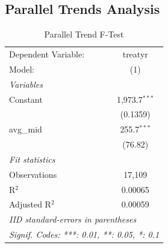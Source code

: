 \documentclass[12pt,a4paper]{article}
\begin{document}
\begin{appendices}
\subsection{Parallel Trends Analysis}\label{app4}
\begin{table}[!hptb]
\centering
\caption{Parallel Trend F-Test\label{paratrend}}
\begin{tabular}{lc}
   \tabularnewline \midrule \midrule
   Dependent Variable: & treatyr\\  
   Model:              & (1)\\  
   \midrule
   \emph{Variables}\\
   Constant            & 1,973.7$^{***}$\\   
                       & (0.1359)\\   
   avg\_mid            & 255.7$^{***}$\\   
                       & (76.82)\\   
   \midrule
   \emph{Fit statistics}\\
   Observations        & 17,109\\  
   R$^2$               & 0.00065\\  
   Adjusted R$^2$      & 0.00059\\  
   \midrule \midrule
   \multicolumn{2}{l}{\emph{IID standard-errors in parentheses}}\\
   \multicolumn{2}{l}{\emph{Signif. Codes: ***: 0.01, **: 0.05, *: 0.1}}\\
\end{tabular}
\end{table}
\newpage


\end{appendices}
\end{document}

